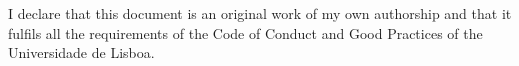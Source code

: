 
\null\vskip20cm%
\noindent
I declare that this document is an original work of my own authorship and that it fulfils all the requirements of the Code of Conduct and Good Practices of the Universidade de Lisboa.
\vfill



\cleardoublepage